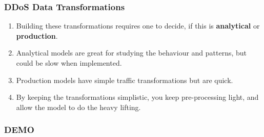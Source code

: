 \documentclass[11pt,
               aspectratio=169,
               hyperref={colorlinks}
               ]{beamer}
\begin{document}
	\begin{frame}
            \frametitle{DDoS Data Transformations}

		\begin{enumerate}
                \item Building these transformations requires one to decide, if this is \textbf{analytical} or \textbf{production}.
                \item Analytical models are great for studying the behaviour and patterns, but could be slow when implemented. 
                \item Production models have simple traffic transformations but are quick. 
                \item By keeping the transformations simplistic, you keep pre-processing light, and allow the model to do the heavy lifting. 
		\end{enumerate}
	\end{frame}

	\begin{frame}
		\frametitle{DEMO}
	\end{frame}
\end{document}
